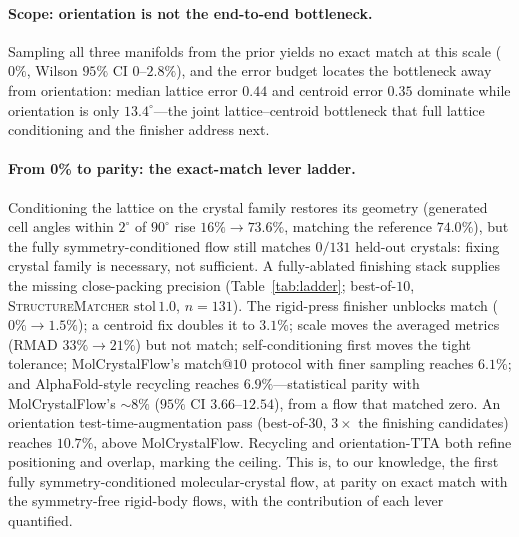 \documentclass[10pt]{article}
\begin{document}
\paragraph{Scope: orientation is not the end-to-end bottleneck.}
Sampling all three manifolds from the prior yields no exact match at this scale
($0\%$, Wilson $95\%$ CI $0$--$2.8\%$), and the error budget locates the bottleneck
away from orientation: median lattice error $0.44$ and centroid error $0.35$
dominate while orientation is only $13.4^\circ$---the joint lattice--centroid
bottleneck that full lattice conditioning and the finisher address next.

\paragraph{From 0\% to parity: the exact-match lever ladder.}
\label{sec:ladder}
Conditioning the lattice on the crystal family restores its geometry (generated
cell angles within $2^\circ$ of $90^\circ$ rise $16\%\!\to\!73.6\%$, matching the
reference $74.0\%$), but the fully symmetry-conditioned flow still matches $0/131$
held-out crystals: fixing crystal family is necessary, not sufficient. A
fully-ablated finishing stack supplies the missing close-packing precision
(Table~\ref{tab:ladder}; best-of-$10$, \textsc{StructureMatcher} $\text{stol}\,1.0$,
$n{=}131$). The rigid-press finisher unblocks match ($0\%\!\to\!1.5\%$); a centroid
fix doubles it to $3.1\%$; scale moves the averaged metrics (RMAD $33\%\!\to\!21\%$)
but not match; self-conditioning first moves the tight tolerance; MolCrystalFlow's
match@$10$ protocol with finer sampling reaches $6.1\%$; and AlphaFold-style
recycling reaches $\mathbf{6.9\%}$---statistical parity with MolCrystalFlow's
$\sim\!8\%$ ($95\%$ CI $3.66$--$12.54$), from a flow that matched zero. An
orientation test-time-augmentation pass (best-of-$30$, $3\times$ the finishing
candidates) reaches $\mathbf{10.7\%}$, above MolCrystalFlow. Recycling and
orientation-TTA both refine positioning and overlap, marking the ceiling. This is,
to our knowledge, the first fully symmetry-conditioned molecular-crystal flow, at
parity on exact match with the symmetry-free rigid-body flows, with the contribution of each lever quantified.
\end{document}
